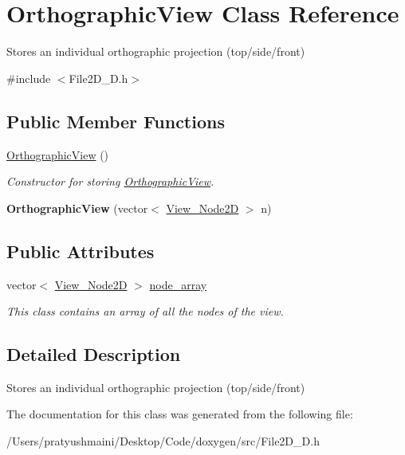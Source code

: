 \hypertarget{class_orthographic_view}{}\section{Orthographic\+View Class Reference}
\label{class_orthographic_view}


Stores an individual orthographic projection (top/side/front)  




{\ttfamily \#include $<$File2\+D\+\_\+D.\+h$>$}

\subsection*{Public Member Functions}
\begin{DoxyCompactItemize}
\item 
\mbox{\label{class_orthographic_view_a19ca4386df3d1852c30e2ff749fd276a}} 
\mbox{\hyperlink{class_orthographic_view_a19ca4386df3d1852c30e2ff749fd276a}{Orthographic\+View}} ()
\begin{DoxyCompactList}\small\item\em Constructor for storing \mbox{\hyperlink{class_orthographic_view}{Orthographic\+View}}. \end{DoxyCompactList}\item 
\mbox{\label{class_orthographic_view_acb46b107847e7dcbbfaa61d15566747e}} 
{\bfseries Orthographic\+View} (vector$<$ \mbox{\hyperlink{class_view___node2_d}{View\+\_\+\+Node2D}} $>$ n)
\end{DoxyCompactItemize}
\subsection*{Public Attributes}
\begin{DoxyCompactItemize}
\item 
\mbox{\label{class_orthographic_view_ab7b38d286f42827f8580f0673202cb17}} 
vector$<$ \mbox{\hyperlink{class_view___node2_d}{View\+\_\+\+Node2D}} $>$ \mbox{\hyperlink{class_orthographic_view_ab7b38d286f42827f8580f0673202cb17}{node\+\_\+array}}
\begin{DoxyCompactList}\small\item\em This class contains an array of all the nodes of the view. \end{DoxyCompactList}\end{DoxyCompactItemize}


\subsection{Detailed Description}
Stores an individual orthographic projection (top/side/front) 

The documentation for this class was generated from the following file\+:\begin{DoxyCompactItemize}
\item 
/\+Users/pratyushmaini/\+Desktop/\+Code/doxygen/src/File2\+D\+\_\+D.\+h\end{DoxyCompactItemize}
